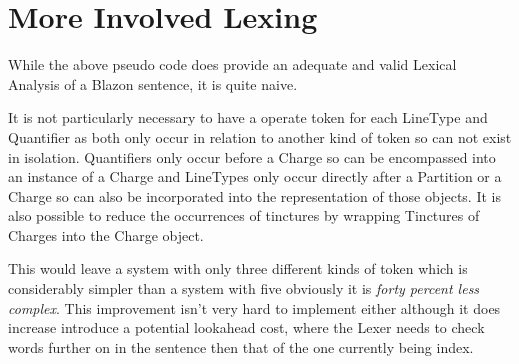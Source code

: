 \section{More Involved Lexing}

While the above pseudo code does provide an adequate and valid Lexical  Analysis of a Blazon sentence, it is quite naive.  

It is not particularly necessary to have a operate token for each LineType and Quantifier as both only occur in relation to another kind of token so can not exist in isolation.   Quantifiers only occur before a Charge so can be encompassed into an instance of a Charge and LineTypes only occur directly after a Partition or a Charge so can also be incorporated into the representation of those objects.  It is also possible to reduce the occurrences of tinctures by wrapping Tinctures of Charges into the  Charge object. 

This would leave a system with only three different kinds of token which is considerably simpler than a system with five obviously it is \emph{forty percent less complex}.  This improvement isn't very hard to implement either although it does increase introduce a potential lookahead cost, where the Lexer needs to check words further on in the sentence then that of the one currently being index. 



